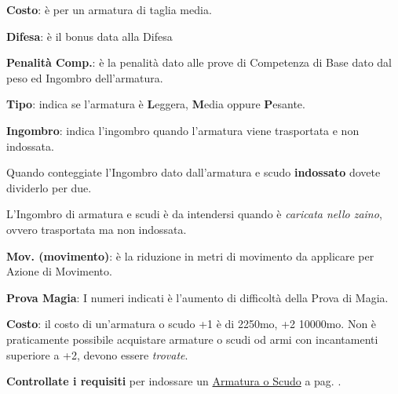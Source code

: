 \begin{multicols}{2}

\medskip

\textbf{Costo}: è per un armatura di taglia media.

\textbf{Difesa}: è il bonus data alla Difesa

\textbf{Penalità Comp.}: è la penalità dato alle prove di Competenza di Base dato dal peso ed Ingombro dell'armatura.

\textbf{Tipo}: indica se l'armatura è \textbf{L}eggera, \textbf{M}edia oppure \textbf{P}esante.

\textbf{Ingombro}: indica l'ingombro quando l'armatura viene trasportata e non indossata.

\begin{changemargin}{0.3cm}{0.3cm}\begin{narratore}
Quando conteggiate l'Ingombro dato dall'armatura e scudo \textbf{indossato} dovete dividerlo per due.

L'Ingombro di armatura e scudi è da intendersi quando è \emph{caricata nello zaino}, ovvero trasportata ma non indossata.
\end{narratore}\end{changemargin}

\textbf{Mov. (movimento)}: è la riduzione in metri di movimento da applicare per Azione di Movimento.

\textbf{Prova Magia}: I numeri indicati è l'aumento di difficoltà della Prova di Magia.

\textbf{Costo}: il costo di un'armatura o scudo +1 è di 2250mo, +2 10000mo. Non è praticamente possibile acquistare armature o scudi od armi con incantamenti superiore a +2, devono essere \emph{trovate}.

\textbf{Controllate i requisiti} per indossare un \hyperlink{indossarearmature}{Armatura o Scudo} a pag. \pageref{indossarearmature}.

\medskip


\end{multicols}
